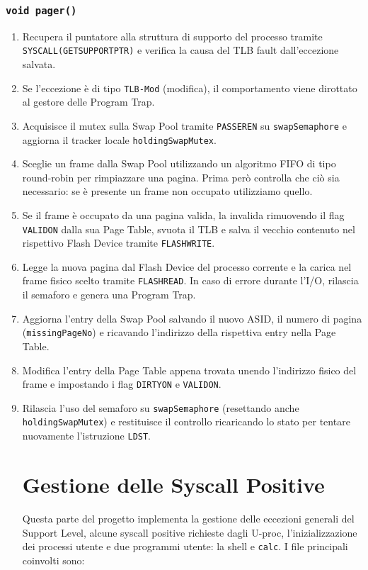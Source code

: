 \documentclass[a4paper,12pt]{article}
\begin{document}
\subsubsection{\texttt{void pager()}}
\begin{enumerate}
    \item Recupera il puntatore alla struttura di supporto del processo tramite \texttt{SYSCALL(GETSUPPORTPTR)} e verifica la causa del TLB fault dall'eccezione salvata.
    \item Se l'eccezione è di tipo \texttt{TLB-Mod} (modifica), il comportamento viene dirottato al gestore delle Program Trap.
    \item Acquisisce il mutex sulla Swap Pool tramite \texttt{PASSEREN} su \texttt{swapSemaphore} e aggiorna il tracker locale \texttt{holdingSwapMutex}.
    \item Sceglie un frame dalla Swap Pool utilizzando un algoritmo FIFO di tipo round-robin per rimpiazzare una pagina. Prima però controlla che ciò sia necessario: se è presente un frame non occupato utilizziamo quello.
    \item Se il frame è occupato da una pagina valida, la invalida rimuovendo il flag \texttt{VALIDON} dalla sua Page Table, svuota il TLB e salva il vecchio contenuto nel rispettivo Flash Device tramite \texttt{FLASHWRITE}.
    \item Legge la nuova pagina dal Flash Device del processo corrente e la carica nel frame fisico scelto tramite \texttt{FLASHREAD}. In caso di errore durante l'I/O, rilascia il semaforo e genera una Program Trap.
    \item Aggiorna l'entry della Swap Pool salvando il nuovo ASID, il numero di pagina (\texttt{missingPageNo}) e ricavando l'indirizzo della rispettiva entry nella Page Table.
    \item Modifica l'entry della Page Table appena trovata unendo l'indirizzo fisico del frame e impostando i flag \texttt{DIRTYON} e \texttt{VALIDON}.
    \item Rilascia l'uso del semaforo su \texttt{swapSemaphore} (resettando anche \texttt{holdingSwapMutex}) e restituisce il controllo ricaricando lo stato per tentare nuovamente l'istruzione \texttt{LDST}.

    
    \section{Gestione delle Syscall Positive}

Questa parte del progetto implementa la gestione delle eccezioni generali del Support Level, alcune syscall positive richieste dagli U-proc, l'inizializzazione dei processi utente e due programmi utente: la shell e \texttt{calc}. I file principali coinvolti sono:


\end{enumerate}
\end{document}
